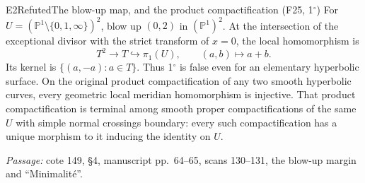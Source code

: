 \begin{result}{E2}{Refuted}{The blow-up map, and the product compactification (F25, 1$^\circ$)}
For $U=(\mathbb P^1\setminus\{0,1,\infty\})^2$, blow up $(0,2)$ in $(\mathbb P^1)^2$. At the intersection of the exceptional divisor with the strict transform of $x=0$, the local homomorphism is
\[
 T^2\longrightarrow T\hookrightarrow\pi_1(U),\qquad (a,b)\longmapsto a+b.
\]
Its kernel is $\{(a,-a):a\in T\}$. Thus 1$^\circ$ is false even for an elementary hyperbolic surface. On the original product compactification of any two smooth hyperbolic curves, every geometric local meridian homomorphism is injective. That product compactification is terminal among smooth proper compactifications of the same $U$ with simple normal crossings boundary: every such compactification has a unique morphism to it inducing the identity on $U$.
\par\emph{Passage:} cote 149, \S4, manuscript pp.~64--65, scans 130--131, the blow-up margin and ``Minimalit\'e''.
\end{result}
